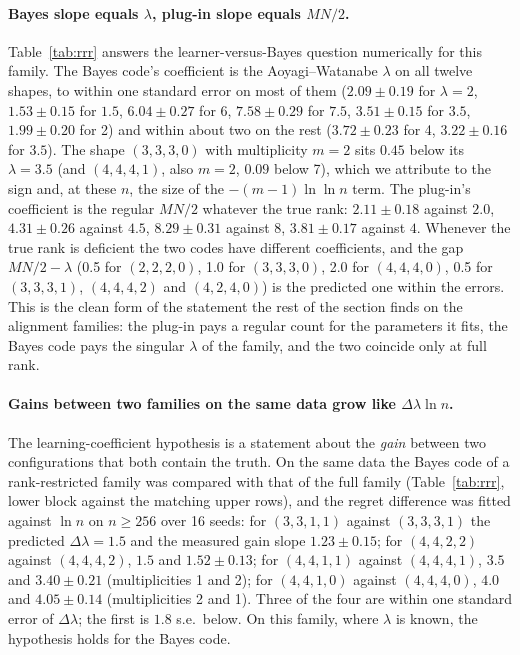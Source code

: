 \documentclass[11pt,a4paper]{article}
\begin{document}
\paragraph{Bayes slope equals $\lambda$, plug-in slope equals $MN/2$.} Table~\ref{tab:rrr} answers the learner-versus-Bayes question numerically for this family. The Bayes code's coefficient is the Aoyagi--Watanabe $\lambda$ on all twelve shapes, to within one standard error on most of them ($2.09\pm0.19$ for $\lambda=2$, $1.53\pm0.15$ for $1.5$, $6.04\pm0.27$ for 6, $7.58\pm0.29$ for $7.5$, $3.51\pm0.15$ for $3.5$, $1.99\pm0.20$ for 2) and within about two on the rest ($3.72\pm0.23$ for 4, $3.22\pm0.16$ for $3.5$). The shape $(3,3,3,0)$ with multiplicity $m=2$ sits $0.45$ below its $\lambda=3.5$ (and $(4,4,4,1)$, also $m=2$, $0.09$ below 7), which we attribute to the sign and, at these $n$, the size of the $-(m-1)\ln\ln n$ term. The plug-in's coefficient is the regular $MN/2$ whatever the true rank: $2.11\pm0.18$ against $2.0$, $4.31\pm0.26$ against $4.5$, $8.29\pm0.31$ against $8$, $3.81\pm0.17$ against $4$. Whenever the true rank is deficient the two codes have different coefficients, and the gap $MN/2-\lambda$ (0.5 for $(2,2,2,0)$, 1.0 for $(3,3,3,0)$, 2.0 for $(4,4,4,0)$, 0.5 for $(3,3,3,1)$, $(4,4,4,2)$ and $(4,2,4,0)$) is the predicted one within the errors. This is the clean form of the statement the rest of the section finds on the alignment families: the plug-in pays a regular count for the parameters it fits, the Bayes code pays the singular $\lambda$ of the family, and the two coincide only at full rank.

\paragraph{Gains between two families on the same data grow like $\Delta\lambda\ln n$.} The learning-coefficient hypothesis is a statement about the \emph{gain} between two configurations that both contain the truth. On the same data the Bayes code of a rank-restricted family was compared with that of the full family (Table~\ref{tab:rrr}, lower block against the matching upper rows), and the regret difference was fitted against $\ln n$ on $n\ge256$ over 16 seeds: for $(3,3,1,1)$ against $(3,3,3,1)$ the predicted $\Delta\lambda=1.5$ and the measured gain slope $1.23\pm0.15$; for $(4,4,2,2)$ against $(4,4,4,2)$, $1.5$ and $1.52\pm0.13$; for $(4,4,1,1)$ against $(4,4,4,1)$, $3.5$ and $3.40\pm0.21$ (multiplicities 1 and 2); for $(4,4,1,0)$ against $(4,4,4,0)$, $4.0$ and $4.05\pm0.14$ (multiplicities 2 and 1). Three of the four are within one standard error of $\Delta\lambda$; the first is $1.8$ s.e.\ below. On this family, where $\lambda$ is known, the hypothesis holds for the Bayes code.
\end{document}
